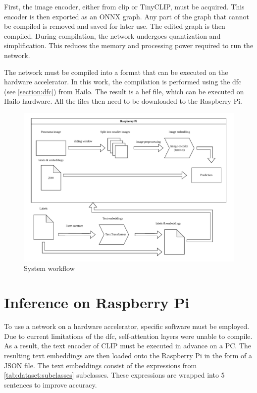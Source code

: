 First, the image encoder, either from \acrshort{clip} or TinyCLIP, must be acquired.  
This encoder is then exported as an ONNX graph.  
Any part of the graph that cannot be compiled is removed and saved for later use.  
The edited graph is then compiled.  
During compilation, the network undergoes quantization and simplification.  
This reduces the memory and processing power required to run the network.  

The network must be compiled into a format that can be executed on the hardware accelerator.  
In this work, the compilation is performed using the \Acrlong{dfc} (see \cref{section:dfc}) from Hailo.  
The result is a \acrshort{hef} file, which can be executed on Hailo hardware.
All the files then need to be downloaded to the Raspberry Pi.
\begin{figure}[h!]
    \centering
    \includegraphics[width=\textwidth]{Images/SystemOverview/Overview.drawio.pdf}
    \caption{System workflow}
    \label{fig:overview:overview}
\end{figure}

\section{Inference on Raspberry Pi}

To use a network on a hardware accelerator, specific software must be employed.  
Due to current limitations of the \acrshort{dfc}, self-attention layers were unable to compile.  
As a result, the text encoder of CLIP must be executed in advance on a PC.  
The resulting text embeddings are then loaded onto the Raspberry Pi in the form of a JSON file.  
The text embeddings consist of the expressions from \cref{tab:dataset:subclasses} subclasses.  
These expressions are wrapped into 5 sentences to improve accuracy.  

